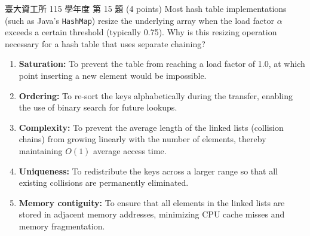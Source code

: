 \begin{pastexam}[label={px:hash-4}]{臺大資工所 115 學年度 第 15 題}
(4 points) Most hash table implementations (such as Java's \texttt{HashMap}) resize the underlying array when the load factor $\alpha$ exceeds a certain threshold (typically 0.75). Why is this resizing operation necessary for a hash table that uses separate chaining?
\begin{enumerate}[label=(\Alph*),leftmargin=2.2em,itemsep=1pt]
\item \textbf{Saturation:} To prevent the table from reaching a load factor of 1.0, at which point inserting a new element would be impossible.
\item \textbf{Ordering:} To re-sort the keys alphabetically during the transfer, enabling the use of binary search for future lookups.
\item \textbf{Complexity:} To prevent the average length of the linked lists (collision chains) from growing linearly with the number of elements, thereby maintaining $O(1)$ average access time.
\item \textbf{Uniqueness:} To redistribute the keys across a larger range so that all existing collisions are permanently eliminated.
\item \textbf{Memory contiguity:} To ensure that all elements in the linked lists are stored in adjacent memory addresses, minimizing CPU cache misses and memory fragmentation.
\end{enumerate}
\end{pastexam}

